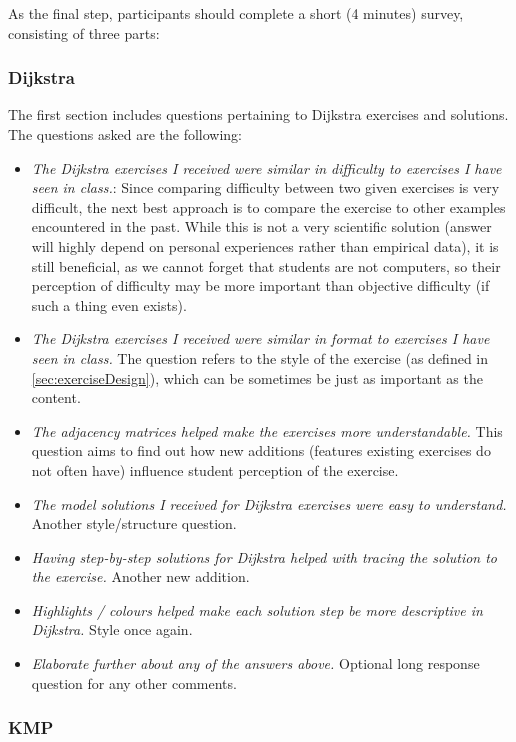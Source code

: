 \documentclass{l4proj}
\begin{document}
As the final step, participants should complete a short (4 minutes) survey, consisting of three parts:

\subsubsection{Dijkstra}

The first section includes questions pertaining to Dijkstra exercises and solutions. The questions asked are the following:

\begin{itemize}
	\item
	\emph{The Dijkstra exercises I received were similar in difficulty to exercises I have seen in class.}: Since comparing difficulty between two given exercises is very difficult, the next best approach is to compare the exercise to other examples encountered in the past. While this is not a very scientific solution (answer will highly depend on personal experiences rather than empirical data), it is still beneficial, as we cannot forget that students are not computers, so their perception of difficulty may be more important than objective difficulty (if such a thing even exists).
	\item
	\emph{The Dijkstra exercises I received were similar in format to exercises I have seen in class.} The question refers to the style of the exercise (as defined in \autoref{sec:exerciseDesign}), which can be sometimes be just as important as the content.
	\item
	\emph{The adjacency matrices helped make the exercises more understandable.} This question aims to find out how new additions (features existing exercises do not often have) influence student perception of the exercise.
	\item
	\emph{The model solutions I received for Dijkstra exercises were easy to understand.} Another style/structure question.
	\item
	\emph{Having step-by-step solutions for Dijkstra helped with tracing the solution to the exercise.} Another new addition.
	\item
	\emph{Highlights / colours helped make each solution step be more descriptive in Dijkstra.} Style once again.
	\item
	\emph{Elaborate further about any of the answers above.} Optional long response question for any other comments.
\end{itemize}

\subsubsection{KMP}
\end{document}
